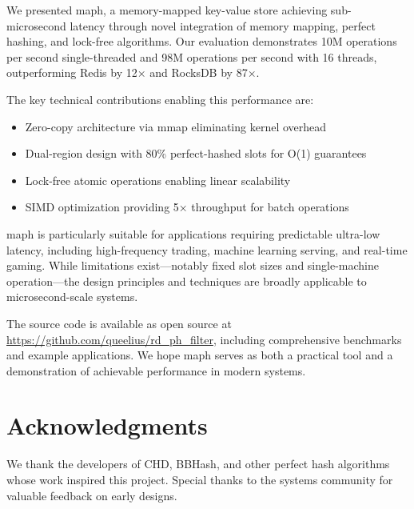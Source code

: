\documentclass[11pt]{article}
\begin{document}
We presented maph, a memory-mapped key-value store achieving sub-microsecond latency through novel integration of memory mapping, perfect hashing, and lock-free algorithms. Our evaluation demonstrates 10M operations per second single-threaded and 98M operations per second with 16 threads, outperforming Redis by 12× and RocksDB by 87×.

The key technical contributions enabling this performance are:
\begin{itemize}
\item Zero-copy architecture via mmap eliminating kernel overhead
\item Dual-region design with 80\% perfect-hashed slots for O(1) guarantees
\item Lock-free atomic operations enabling linear scalability
\item SIMD optimization providing 5× throughput for batch operations
\end{itemize}

maph is particularly suitable for applications requiring predictable ultra-low latency, including high-frequency trading, machine learning serving, and real-time gaming. While limitations exist—notably fixed slot sizes and single-machine operation—the design principles and techniques are broadly applicable to microsecond-scale systems.

The source code is available as open source at \url{https://github.com/queelius/rd_ph_filter}, including comprehensive benchmarks and example applications. We hope maph serves as both a practical tool and a demonstration of achievable performance in modern systems.

\section*{Acknowledgments}

We thank the developers of CHD, BBHash, and other perfect hash algorithms whose work inspired this project. Special thanks to the systems community for valuable feedback on early designs.
\end{document}
